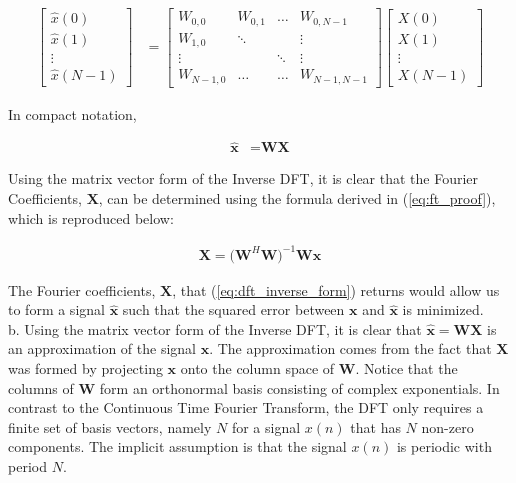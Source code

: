 \begin{align*}
\begin{bmatrix}
\hat{x}(0) \\
\hat{x}(1) \\
\vdots\\
\hat{x}(N-1)
\end{bmatrix}
&=
\begin{bmatrix}
    W_{0,0}		& W_{0,1} 	& \dots	& W_{0,N-1} \\
    W_{1,0} 		& \ddots  	&		& \vdots		\\
   	\vdots		& 			& \ddots	& \vdots		\\
   	W_{N-1,0} 	& \dots 		& \dots	& W_{N-1,N-1}
\end{bmatrix} 
\begin{bmatrix}
X(0) \\
X(1) \\
\vdots \\
X(N-1)
\end{bmatrix}
\end{align*}

\noindent{}In compact notation, 

\begin{align*}
\hat{\textbf{x}} &= \textbf{W}\textbf{X}
\end{align*}

\noindent{}Using the matrix vector form of the Inverse DFT, it is clear that the Fourier Coefficients, $\textbf{X}$, can be determined using the formula derived in (\ref{eq:ft_proof}), which is reproduced below:

\begin{align}
\textbf{X} = \big(\textbf{W}^H\textbf{W}\big)^{-1} \textbf{W}\textbf{x}\label{eq:dft_inverse_form}
\end{align}
 
\noindent{}The Fourier coefficients, $\textbf{X}$, that (\ref{eq:dft_inverse_form}) returns would allow us to form a signal $\hat{\textbf{x}}$ such that the squared error between $\textbf{x}$ and $\hat{\textbf{x}}$ is minimized.\\

\noindent{}b. Using the matrix vector form of the Inverse DFT, it is clear that $\hat{\textbf{x}} = \textbf{W}\textbf{X}$ is an approximation of the signal $\textbf{x}$. The approximation comes from the fact that $\textbf{X}$ was formed by projecting $\textbf{x}$ onto the column space of $\textbf{W}$. Notice that the columns of $\textbf{W}$ form an orthonormal basis consisting of complex exponentials. In contrast to the Continuous Time Fourier Transform, the DFT only requires a finite set of basis vectors, namely $N$ for a signal $x(n)$ that has $N$ non-zero components. The implicit assumption is that the signal $x(n)$ is periodic with period $N$.\\

